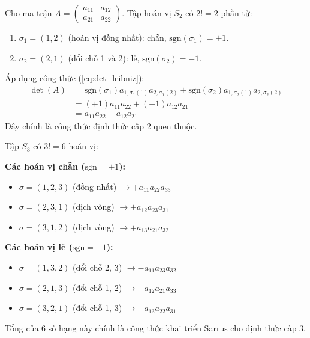 \begin{vidu}[Trường hợp $n=2$]
Cho ma trận $A = \begin{pmatrix} a_{11} & a_{12} \\ a_{21} & a_{22} \end{pmatrix}$.
Tập hoán vị $S_2$ có $2! = 2$ phần tử:
\begin{enumerate}
    \item $\sigma_1 = (1, 2)$ (hoán vị đồng nhất): chẵn, $\text{sgn}(\sigma_1) = +1$.
    \item $\sigma_2 = (2, 1)$ (đổi chỗ 1 và 2): lẻ, $\text{sgn}(\sigma_2) = -1$.
\end{enumerate}
Áp dụng công thức (\ref{eq:det_leibniz}):
\begin{align*}
\det(A) &= \text{sgn}(\sigma_1) a_{1, \sigma_1(1)} a_{2, \sigma_1(2)} + \text{sgn}(\sigma_2) a_{1, \sigma_2(1)} a_{2, \sigma_2(2)} \\
&= (+1) a_{11} a_{22} + (-1) a_{12} a_{21} \\
&= a_{11}a_{22} - a_{12}a_{21}
\end{align*}
Đây chính là công thức định thức cấp 2 quen thuộc.
\end{vidu}

\begin{vidu}[Trường hợp $n=3$ (Quy tắc Sarrus)]
Tập $S_3$ có $3! = 6$ hoán vị:

\textbf{Các hoán vị chẵn ($\text{sgn} = +1$):}
\begin{itemize}
    \item $\sigma = (1, 2, 3)$ (đồng nhất) $\to +a_{11}a_{22}a_{33}$
    \item $\sigma = (2, 3, 1)$ (dịch vòng) $\to +a_{12}a_{23}a_{31}$
    \item $\sigma = (3, 1, 2)$ (dịch vòng) $\to +a_{13}a_{21}a_{32}$
\end{itemize}

\textbf{Các hoán vị lẻ ($\text{sgn} = -1$):}
\begin{itemize}
    \item $\sigma = (1, 3, 2)$ (đổi chỗ 2, 3) $\to -a_{11}a_{23}a_{32}$
    \item $\sigma = (2, 1, 3)$ (đổi chỗ 1, 2) $\to -a_{12}a_{21}a_{33}$
    \item $\sigma = (3, 2, 1)$ (đổi chỗ 1, 3) $\to -a_{13}a_{22}a_{31}$
\end{itemize}

Tổng của 6 số hạng này chính là công thức khai triển Sarrus cho định thức cấp 3.
\end{vidu}